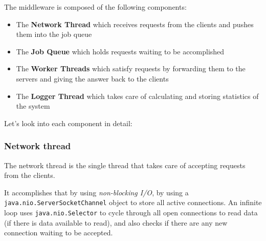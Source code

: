 \documentclass[11pt,a4paper]{article}
\renewcommand{\t}[1]{%
	{\texttt{#1}}}
\begin{document}
The middleware is composed of the following components:
\begin{itemize}
	\item The \textbf{Network Thread} which receives requests from the clients and 
		pushes them into the job queue
	\item The \textbf{Job Queue} which holds requests waiting to be accomplished
	\item The \textbf{Worker Threads} which satisfy requests by forwarding them 
		to the servers and giving the answer back to the clients
	\item The \textbf{Logger Thread} which takes care of calculating
		and storing statistics of the system
\end{itemize}
Let's look into each component in detail:

\subsubsection{Network thread}

The network thread is the single thread that takes care of accepting requests from the clients.

It accomplishes that by using \emph{non-blocking I/O}, by using a \t{java.nio.ServerSocketChannel}
object to store all active connections.
An infinite loop uses \t{java.nio.Selector} to cycle through all open connections to read
data (if there is data available to read), and also checks if there are any new connection
waiting to be accepted.
\end{document}
